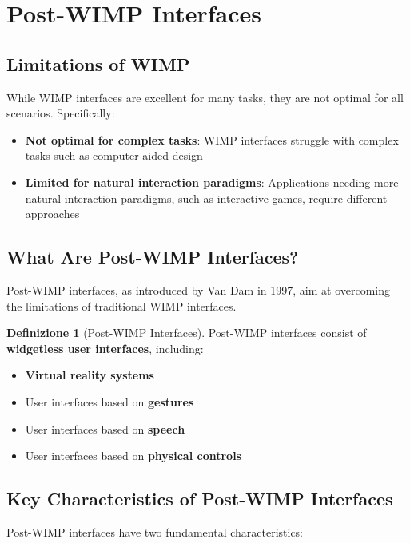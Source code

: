 \documentclass[11pt,a4paper]{article}
\theoremstyle{definition}
\newtheorem{definition}{Definizione}[section]
\theoremstyle{plain}
\theoremstyle{remark}
\begin{document}
\section{Post-WIMP Interfaces}

\subsection{Limitations of WIMP}

While WIMP interfaces are excellent for many tasks, they are not optimal for all scenarios. Specifically:

\begin{itemize}
    \item \textbf{Not optimal for complex tasks}: WIMP interfaces struggle with complex tasks such as computer-aided design
    \item \textbf{Limited for natural interaction paradigms}: Applications needing more natural interaction paradigms, such as interactive games, require different approaches
\end{itemize}

\subsection{What Are Post-WIMP Interfaces?}

Post-WIMP interfaces, as introduced by Van Dam in 1997, aim at overcoming the limitations of traditional WIMP interfaces.

\begin{definition}[Post-WIMP Interfaces]
Post-WIMP interfaces consist of \textbf{widgetless user interfaces}, including:
\begin{itemize}
    \item \textbf{Virtual reality systems}
    \item User interfaces based on \textbf{gestures}
    \item User interfaces based on \textbf{speech}
    \item User interfaces based on \textbf{physical controls}
\end{itemize}
\end{definition}

\subsection{Key Characteristics of Post-WIMP Interfaces}

Post-WIMP interfaces have two fundamental characteristics:
\end{document}
